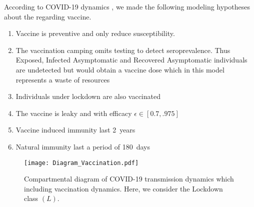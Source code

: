 %
\begin{assumptions}
     According to COVID-19 dynamics , we
     made the following modeling hypotheses about the regarding vaccine.
     \begin{enumerate}[label={\textbf{(VH-\arabic*)}}]
        \item
            Vaccine is preventive and only reduce susceptibility.
            
        \item
            The vaccination camping omits testing to detect seroprevalence.
            Thus Exposed, Infected Asymptomatic and Recovered Asymptomatic
            individuals are undetected but would obtain a vaccine dose
            \textemdash which in this model represents a waste of resources
        \item
            Individuals under lockdown are also vaccinated
        \item
            The vaccine is leaky and with efficacy $\epsilon \in[0.7, .975]$
        \item   
            Vaccine induced immunity last \SI{2}{years}
        \item   
            Natural immunity last a period of \SI{180}{days} 
     \end{enumerate}
\end{assumptions}
\begin{figure*}[tbh]
    \centering
      \texttt{[image: Diagram\_Vaccination.pdf]}
    \caption{Compartmental diagram of COVID-19 transmission dynamics which 
        including vaccination dynamics. Here, we consider the Lockdown class $(L)$.}
    \label{fig:diagram_vaccination}
\end{figure*}


